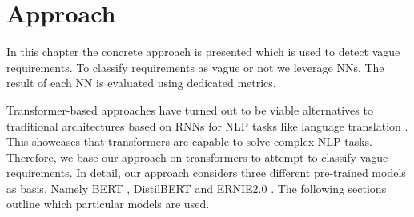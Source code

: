 \chapter{Approach}
\label{chp:approach}


In this chapter the concrete approach is presented which is used to detect vague requirements.
To classify requirements as vague or not we leverage \acp{NN}.
The result of each \ac{NN} is evaluated using dedicated metrics.

Transformer-based approaches have turned out to be viable alternatives to traditional architectures based on \acp{RNN} for \ac{NLP} tasks like language translation \parencites{Gehring:2017}{Vaswani:2017}.
This showcases that transformers are capable to solve complex \ac{NLP} tasks.
Therefore, we base our approach on transformers to attempt to classify vague requirements.
In detail, our approach considers three different pre-trained models as basis.
Namely \ac{BERT} \parencite{Devlin:2018}, \ac{DistilBERT} \parencite{Sanh:2019} and \ac{ERNIE2.0} \parencite{Sun:2019a}.
The following sections outline which particular models are used.




